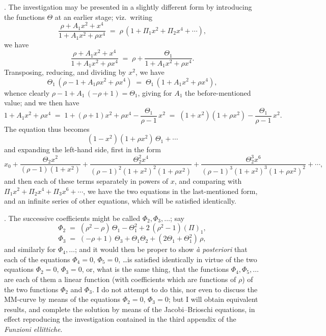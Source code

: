 \documentclass[11pt]{article}
\begin{document}
\newpage

. The investigation may be presented in a slightly different form by introducing the functions $\Theta$ at an earlier stage; viz.\ writing
\[
\frac{\rho + A_1 x^2 + x^4}{1 + A_1 x^2 + \rho x^4} \;=\; \rho\,(1 + \Pi_1 x^2 + \Pi_2 x^4 + \cdots),
\]
we have
\[
\frac{\rho + A_1 x^2 + x^4}{1 + A_1 x^2 + \rho x^4} \;=\; \rho + \frac{\Theta_1}{1 + A_1 x^2 + \rho x^4}.
\]
Transposing, reducing, and dividing by $x^2$, we have
\[
\Theta_1\,(\rho - 1 + A_1\rho x^2 + \rho x^4) \;=\; \Theta_1\,(1 + A_1 x^2 + \rho x^4),
\]
whence clearly $\rho - 1 + A_1\,(- \rho + 1) = \Theta_1$, giving for $A_1$ the before-mentioned value; and we then have
\[
1 + A_1 x^2 + \rho x^4 \;=\; 1 + (\rho + 1)x^2 + \rho x^4 - \frac{\Theta_1}{\rho - 1}\,x^2 \;=\; (1 + x^2)(1 + \rho x^2) - \frac{\Theta_1}{\rho - 1}\,x^2.
\]
The equation thus becomes
\[
(1 - x^2)(1 + \rho x^2)\,\Theta_1 + \cdots
\]
and expanding the left-hand side, first in the form
\[
x_0 + \frac{\Theta_2 x^2}{(\rho - 1)(1 + x^2)} + \frac{\Theta_2^2 x^4}{(\rho - 1)^2(1 + x^2)^2(1 + \rho x^2)} + \frac{\Theta_2^3 x^6}{(\rho - 1)^3(1 + x^2)^3(1 + \rho x^2)^2} + \cdots,
\]
and then each of these terms separately in powers of $x$, and comparing with $\Pi_1 x^2 + \Pi_2 x^4 + \Pi_3 x^6 + \cdots$, we have the two equations in the last-mentioned form, and an infinite series of other equations, which will be satisfied identically.

\medskip

. The successive coefficients might be called $\Phi_2, \Phi_3, \ldots$; say
\[
\Phi_2 \;=\; (\rho^2 - \rho)\,\Theta_1 - \Theta_1^2 + 2\,(\rho^2 - 1)(\Pi)_1,
\]
\[
\Phi_3 \;=\; (-\rho + 1)\,\Theta_3 + \Theta_1\Theta_2 + (2\Theta_1 + \Theta_1^2)\,\rho,
\]
and similarly for $\Phi_4, \ldots$; and it would then be proper to show \textit{\`a posteriori} that each of the equations $\Phi_4 = 0$, $\Phi_5 = 0$, \ldots is satisfied identically in virtue of the two equations $\Phi_2 = 0$, $\Phi_3 = 0$, or, what is the same thing, that the functions $\Phi_4, \Phi_5, \ldots$ are each of them a linear function (with coefficients which are functions of $\rho$) of the two functions $\Phi_2$ and $\Phi_3$. I do not attempt to do this, nor even to discuss the MM-curve by means of the equations $\Phi_2 = 0$, $\Phi_3 = 0$; but I will obtain equivalent results, and complete the solution by means of the Jacobi--Brioschi equations, in effect reproducing the investigation contained in the third appendix of the \textit{Funzioni ellittiche}.
\end{document}
